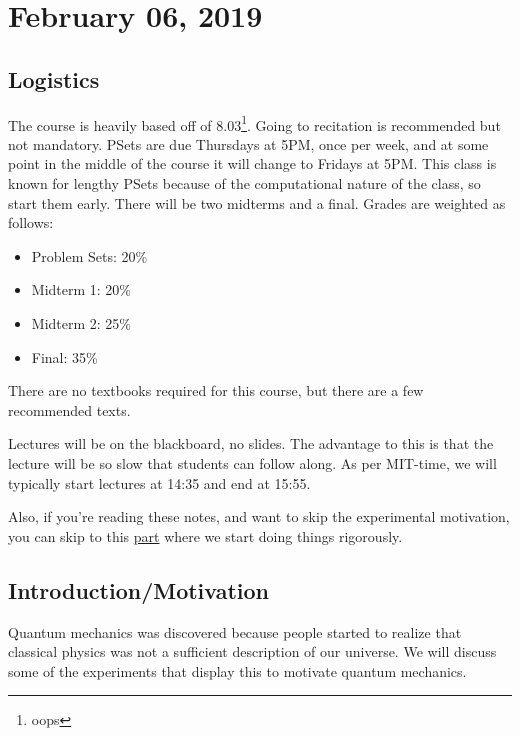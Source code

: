 \documentclass{standalone}
\begin{document}
\section{February 06, 2019}
\subsection{Logistics}
The course is heavily based off of 8.03\footnote{oops}.
Going to recitation is recommended but not mandatory.
PSets are due Thursdays at 5PM, once per week, and at some point
in the middle of the course it will change to Fridays at 5PM.\@
This class is known for lengthy PSets because of the computational nature
of the class, so start them early.
There will be two midterms and a final.
Grades are weighted as follows:
\begin{itemize}
	\item Problem Sets: 20\%
	\item Midterm 1: 20\%
	\item Midterm 2: 25\%
	\item Final: 35\%
\end{itemize}
There are no textbooks required for this course,
but there are a few recommended texts.

Lectures will be on the blackboard, no slides.
The advantage to this is that the lecture will be
so slow that students can follow along.
As per MIT-time, we will typically start lectures at 14:35 and end at 15:55.

Also, if you're reading these notes, and want to skip
the experimental motivation, you can skip to
this \hyperref[subsect:rigorous]{part} where we start doing things rigorously.

\subsection{Introduction/Motivation}
Quantum mechanics was discovered because people started to realize that
classical physics was not a sufficient description of our universe.
We will discuss some of the experiments that display this
to motivate quantum mechanics.

\iffalse
\begin{itemize}
	\item blackbody radiation
	\item double slit
	\item photoelectric effect
	\item Compton effect
\end{itemize}
\fi
\end{document}
